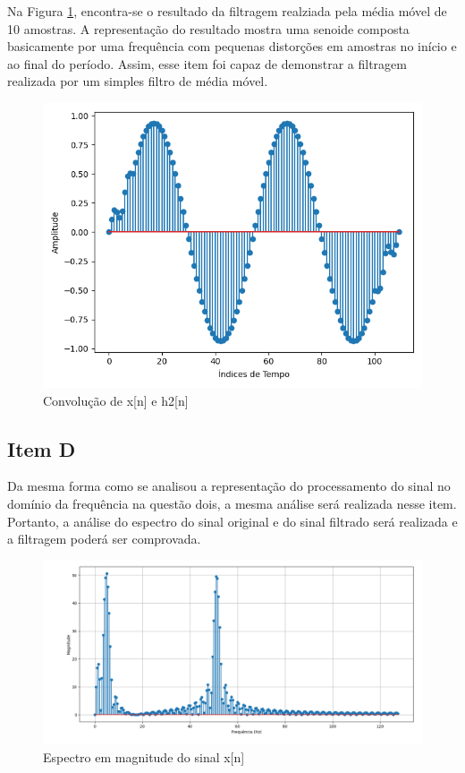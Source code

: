 Na Figura \ref{fig:graph_22}, encontra-se o resultado da filtragem realziada pela média móvel de 10 amostras. A representação do resultado mostra uma senoide composta basicamente por uma frequência com pequenas distorções em amostras no início e ao final do período. Assim, esse item foi capaz de demonstrar a filtragem realizada por um simples filtro de média móvel.

\begin{figure}[!htb]
    \centering
    \includegraphics[width=\linewidth]{Imagens/fig22.png}
    \caption{Convolução de x[n] e h2[n]}
    \label{fig:graph_22}
\end{figure}

\newpage
\subsection{Item D}
Da mesma forma como se analisou a representação do processamento do sinal no domínio da frequência na questão dois, a mesma análise será realizada nesse item. Portanto, a análise do espectro do sinal original e do sinal filtrado será realizada e a filtragem poderá ser comprovada.

\begin{figure}[!htb]
    \centering
    \includegraphics[width=\linewidth]{Imagens/fig23.png}
    \caption{Espectro em magnitude do sinal x[n]}
    \label{fig:graph_23}
\end{figure}

